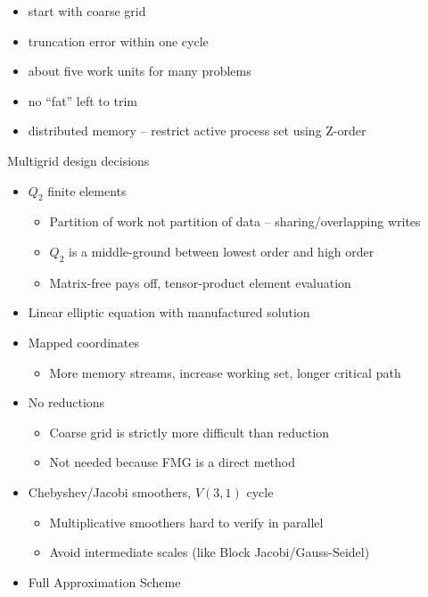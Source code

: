 \documentclass{beamer}
\begin{document}
\begin{frame}[fragile]
\begin{figure}
\label{fig:FMG}
\end{figure}
\begin{itemize}
  \item start with coarse grid
  \item truncation error within one cycle
  \item about five work units for many problems
  \item no ``fat'' left to trim
  \item distributed memory -- restrict active process set using Z-order
\end{itemize}
\end{frame}

\begin{frame}{Multigrid design decisions}
  \begin{itemize}
  \item $Q_2$ finite elements
    \begin{itemize}
    \item Partition of work not partition of data -- sharing/overlapping writes
    \item $Q_2$ is a middle-ground between lowest order and high order
    \item Matrix-free pays off, tensor-product element evaluation
    \end{itemize}
  \item Linear elliptic equation with manufactured solution
  \item Mapped coordinates
    \begin{itemize}
    \item More memory streams, increase working set, longer critical path
    \end{itemize}
  \item No reductions
    \begin{itemize}
    \item Coarse grid is strictly more difficult than reduction
    \item Not needed because FMG is a direct method
    \end{itemize}
  \item Chebyshev/Jacobi smoothers, $V(3,1)$ cycle
    \begin{itemize}
    \item Multiplicative smoothers hard to verify in parallel
    \item Avoid intermediate scales (like Block Jacobi/Gauss-Seidel)
    \end{itemize}
  \item Full Approximation Scheme
  \end{itemize}
\end{frame}
\end{document}
